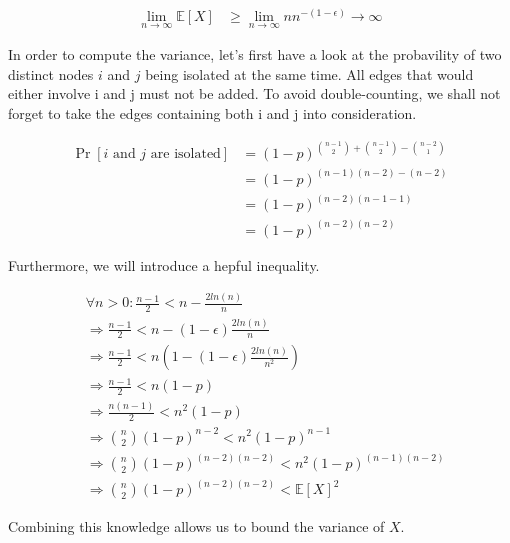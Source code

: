 \documentclass[a4paper,german]{article}
\begin{document}
\begin{enumerate}
\begin{align*}
\lim_{n \to \infty} \mathbb{E}[X] &\geq \lim_{n \to \infty} n n^{-(1 - \epsilon)} \to \infty
\end{align*}

In order to compute the variance, let's first have a look at the probavility of two distinct nodes \(i\) and \(j\) being isolated at the same time. All edges that would either involve i and j must not be added. To avoid double-counting, we shall not forget to take the edges containing both i and j into consideration.

\begin{align}
\Pr[i \text{ and } j \text{ are isolated}] &= (1-p)^{ {{n-1} \choose {2}} + {{n-1} \choose {2}} - {{n-2} \choose {1}} } \nonumber\\ 
&=  (1-p)^{(n-1)(n-2) - (n-2) } \nonumber \\
&=  (1-p)^{(n-2)(n-1 -1 ) } \nonumber \\
&=  (1-p)^{(n-2)(n-2) }  \label{eq1} 
\end{align}

Furthermore, we will introduce a hepful inequality.

\begin{align}
& \forall n > 0: \frac{n-1}{2} < n - \frac{2ln(n)}{n} \nonumber \\
& \Rightarrow \frac{n-1}{2} < n - (1-\epsilon) \frac{2ln(n)}{n} \nonumber \\
& \Rightarrow \frac{n-1}{2} < n(1 - (1-\epsilon) \frac{2ln(n)}{n^2}) \nonumber \\
& \Rightarrow \frac{n-1}{2}  < n(1-p) \nonumber \\
& \Rightarrow \frac{n(n-1)}{2}  < n^2(1-p) \nonumber \\
& \Rightarrow {{n} \choose {2}} (1-p)^{n-2} < n^2(1-p)^{n-1} \nonumber \\
& \Rightarrow {{n} \choose {2}} (1-p)^{(n-2)(n-2)} < n^2(1-p)^{(n-1)(n-2)} \nonumber \\
& \Rightarrow {{n} \choose {2}} (1-p)^{(n-2)(n-2)} < \mathbb{E}[X]^2 \label{eq2}
\end{align}

Combining this knowledge allows us to bound the variance of \(X\).


\end{enumerate}
\end{document}
